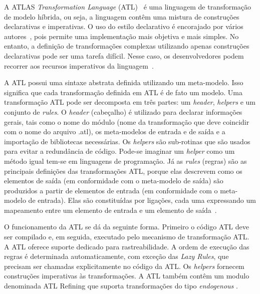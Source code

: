 A ATLAS \emph{Transformation Language} (ATL)~\cite{ATL_eclipse} é uma linguagem de transformação de modelo híbrida, ou seja, a linguagem contêm uma mistura de construções declarativas e imperativas. O uso do estilo declarativo é encorajado por vários autores~\cite{Allilaire_06, Jouault_2005, Jouault_2008}, pois permite uma implementação mais objetiva e mais simples. No entanto, a definição de transformações complexas utilizando apenas construções declarativas pode ser uma tarefa difícil. Nesse caso, os desenvolvedores podem recorrer aos recursos imperativos da linguagem~\cite{Allilaire_06}.

A ATL possui uma sintaxe abstrata definida utilizando um meta-modelo. Isso significa que cada transformação definida em ATL é de fato um modelo. Uma transformação ATL pode ser decomposta em três partes: um \textit{header}, \textit{helpers} e um conjunto de \textit{rules}. O \textit{header} (cabeçalho) é utilizado para declarar informações gerais, tais como o nome do módulo (nome da transformação que deve coincidir com o nome do arquivo .atl), os meta-modelos de entrada e de saída  e a importação de bibliotecas necessárias. Os \textit{helpers} são sub-rotinas que são usados para evitar a redundância de código. Pode-se imaginar um \textit{helper} como um método igual tem-se em linguagens de programação. Já as \textit{rules} (regras) são as principais definições das transformações ATL, porque elas descrevem como os elementos de saída (em conformidade com o meta-modelo de saída) são produzidos a partir de elementos de entrada (em conformidade com o meta-modelo de entrada). Elas são constituídas por ligações, cada uma expressando um mapeamento entre um elemento de entrada e um elemento de saída~\cite{ATL_eclipse}.

O funcionamento da ATL se dá da seguinte forma. Primeiro o código ATL deve ser compilado e, em seguida, executado pelo mecanismo de transformação ATL. A ATL oferece suporte dedicado para rastreabilidade. A ordem de execução das regras é determinada automaticamente, com exceção das \textit{Lazy Rules}, que precisam ser chamadas explicitamente no código da ATL. Os \textit{helpers} fornecem construções imperativas às transformações. A ATL também contêm um modulo denominada ATL Refining que suporta transformações do tipo \emph{endogenous} .

